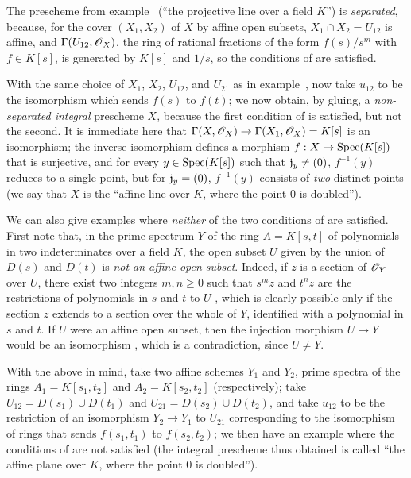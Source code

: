 \begin{exm}[5.5.11]
\label{1.5.5.11}
The prescheme from example~ (``the projective line over a field $K$'') is \emph{separated}, because, for the cover $(X_1,X_2)$ of $X$ by affine open subsets, $X_1\cap X_2=U_{12}$ is affine, and $\Gamma(U_{12},\mathscr{O}_X)$, the ring of rational fractions of the form $f(s)/s^m$ with $f\in K[s]$, is generated by $K[s]$ and $1/s$, so the conditions of  are satisfied.

With the same choice of $X_1$, $X_2$, $U_{12}$, and $U_{21}$ as in example~, now take $u_{12}$ to be the isomorphism which sends $f(s)$ to $f(t)$;
we now obtain, by gluing, a \emph{non-separated integral} prescheme $X$, because the first condition of  is satisfied, but not the second.
It is immediate here that $\Gamma(X,\OO_X)\to\Gamma(X_1,\OO_X)=K[s]$ is an isomorphism;
the inverse isomorphism defines a morphism $f:X\to\Spec(K[s])$ that is surjective, and for every $y\in{\mathop{\mathrm{Spec}}\nolimits}(K[s])$ such that $\mathfrak{j}_y\neq(0)$, $f^{-1}(y)$ reduces to a single point, but for $\mathfrak{j}_y=(0)$, $f^{-1}(y)$ consists of \emph{two} distinct points (we say that $X$ is the ``affine line over $K$, where the point $0$ is doubled'').

We can also give examples where \emph{neither} of the two conditions of  are satisfied.
First note that, in the prime spectrum $Y$ of the ring $A=K[s,t]$ of polynomials in two indeterminates over a field $K$, the open subset $U$ given by the union of $D(s)$ and $D(t)$ is \emph{not an affine open subset}.
Indeed, if $z$ is a section of $\mathscr{O}_Y$ over $U$, there exist two integers $m,n\geq0$ such that $s^mz$ and $t^nz$ are the restrictions of polynomials in $s$ and $t$ to $U$ , which is clearly possible only if the section $z$ extends to a section over the whole of $Y$, identified with a polynomial in $s$ and $t$.
If $U$ were an affine open subset, then the injection morphism $U\to Y$ would be an isomorphism , which is a contradiction, since $U\neq Y$.

With the above in mind, take two affine schemes $Y_1$ and $Y_2$, prime spectra of the rings $A_1=K[s_1,t_2]$ and $A_2=K[s_2,t_2]$ (respectively);
take $U_{12}=D(s_1)\cup D(t_1)$ and $U_{21}=D(s_2)\cup D(t_2)$, and take $u_{12}$ to be the restriction of an isomorphism $Y_2\to Y_1$ to $U_{21}$ corresponding to the isomorphism of rings that sends $f(s_1,t_1)$ to $f(s_2,t_2)$;
we then have an example where the conditions of  are not satisfied (the integral prescheme thus obtained is called ``the affine plane over $K$, where the point $0$ is doubled'').
\end{exm}

